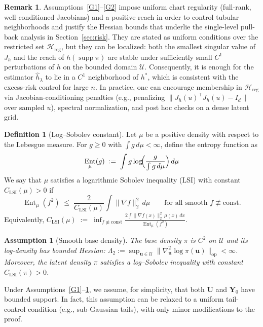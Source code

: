 \documentclass[12pt]{article}
\newtheorem{assumption}{Assumption}
\theoremstyle{definition} %
\newtheorem{definition}{Definition}
\newtheorem{remark}{Remark}
\DeclareMathOperator{\Ent}{Ent} %
\newcommand{\U}{\bm U}
\newcommand{\Y}{\bm Y}
\newcommand{\supp}{\operatorname{supp}}
\begin{document}
\begin{remark}\label{rem:assumptions-local}
Assumptions~\ref{G1}--\ref{G2} impose uniform chart regularity (full-rank, well-conditioned Jacobians) and a positive reach in order to control tubular neighborhoods and justify the Hessian bounds that underlie the single-level pull-back analysis in Section~\ref{sec:risk}.
They are stated as uniform conditions over the restricted set $\mathcal{H}_{\mathrm{reg}}$, but they can be localized: both the smallest singular value of $J_h$ and the reach of $h(\supp\pi)$ are stable under sufficiently small $C^1$ perturbations of $h$ on the bounded domain $\mathcal U$.
Consequently, it is enough for the estimator $\hat h_{\lambda}$ to lie in a $C^1$ neighborhood of $h^*$, which is consistent with the excess-risk control for large $n$.
In practice, one can encourage membership in $\mathcal{H}_{\mathrm{reg}}$ via Jacobian-conditioning penalties (e.g., penalizing $\|J_h(u)^\top J_h(u)-I_d\|$ over sampled $u$), spectral normalization, and post hoc checks on a dense latent grid.
\end{remark}

\begin{definition}[Log--Sobolev constant]\label{def:lsi}
Let $\mu$ be a positive density with respect to the Lebesgue measure. For $g\ge 0$ with $\int g\,d\mu<\infty$, define
the entropy function as 
\[
\Ent_{\mu}(g)
\;:=\;
\int g\log\!\Bigl(\frac{g}{\int g\,d\mu}\Bigr)\,d\mu
\]
We say that $\mu$ satisfies a logarithmic Sobolev inequality (LSI) with constant $C_{\mathrm{LSI}}(\mu)>0$ if
\[
\Ent_{\mu}(f^2)
\;\le\;
\frac{2}{C_{\mathrm{LSI}}(\mu)}\int \|\nabla f\|_2^2\,d\mu
\qquad\text{for all smooth }f\not\equiv\mathrm{const}.
\]
Equivalently,
$C_{\mathrm{LSI}}(\mu)
\;:=\;
\inf_{f\not\equiv\mathrm{const}}
\frac{2\int \|\nabla f(x)\|_2^2\,\mu(x)\,dx}{\Ent_{\mu}(f^2)}$.
\end{definition}

\begin{assumption}[Smooth base density]\label{G3}
The base density $\pi$ is $C^{2}$ on $\mathcal{U}$ and its log-density has bounded Hessian:
$\Lambda_2 := \sup_{\bm u\in\mathcal{U}}\bigl\|\nabla_{\bm u}^2\log \pi(\bm u)\bigr\|_{\mathrm{op}} < \infty$.
Moreover, the latent density $\pi$ satisfies a log--Sobolev inequality with constant $C_{\mathrm{LSI}}(\pi)>0$.
\end{assumption}

Under Assumptions~\ref{G1}--\ref{G3}, we assume, for simplicity, that both $\U$ and $\Y_0$ have bounded support. In fact, this assumption can be relaxed to a uniform tail-control condition (e.g., sub-Gaussian tails), with only minor modifications to the proof.
\end{document}
